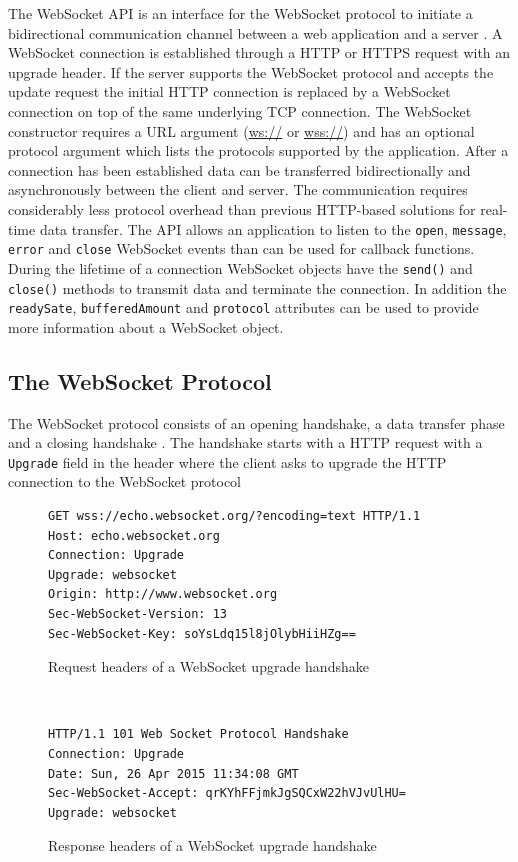 The WebSocket API is an interface for the WebSocket protocol to initiate a bidirectional communication channel between a web application and a server \cite{hickson2011websocket}. A WebSocket connection is established through a HTTP or HTTPS request with an upgrade header. If the server supports the WebSocket protocol and accepts the update request the initial HTTP connection is replaced by a WebSocket connection on top of the same underlying TCP connection. The WebSocket constructor requires a URL argument (\url{ws://} or \url{wss://}) and has an optional protocol argument which lists the protocols supported by the application. After a connection has been established data can be transferred bidirectionally and asynchronously between the client and server. The communication requires considerably less protocol overhead than previous HTTP-based solutions for real-time data transfer. The API allows an application to listen to the \texttt{open}, \texttt{message}, \texttt{error} and \texttt{close} WebSocket events than can be used for callback functions. During the lifetime of a connection WebSocket objects have the \texttt{send()} and \texttt{close()} methods to transmit data and terminate the connection. In addition the \texttt{readySate}, \texttt{bufferedAmount} and \texttt{protocol} attributes can be used to provide more information about a WebSocket object. 

\subsection{The WebSocket Protocol}

The WebSocket protocol consists of an opening handshake, a data transfer phase and a closing handshake \cite{fette2011websocket}. The handshake starts with a HTTP request with a \texttt{Upgrade} field in the header where the client asks to upgrade the HTTP connection to the WebSocket protocol
\\
\begin{figure}[h!]
\begin{Verbatim}[fontsize=\small]
GET wss://echo.websocket.org/?encoding=text HTTP/1.1
Host: echo.websocket.org
Connection: Upgrade
Upgrade: websocket
Origin: http://www.websocket.org
Sec-WebSocket-Version: 13
Sec-WebSocket-Key: soYsLdq15l8jOlybHiiHZg==
\end{Verbatim}
\caption{Request headers of a WebSocket upgrade handshake}
\label{request-headers}
\end{figure}
\ \\
\begin{figure}[h!]
\begin{Verbatim}[fontsize=\small]
HTTP/1.1 101 Web Socket Protocol Handshake
Connection: Upgrade
Date: Sun, 26 Apr 2015 11:34:08 GMT
Sec-WebSocket-Accept: qrKYhFFjmkJgSQCxW22hVJvUlHU=
Upgrade: websocket
\end{Verbatim}
\caption{Response headers of a WebSocket upgrade handshake}
\label{response-headers}
\end{figure}

